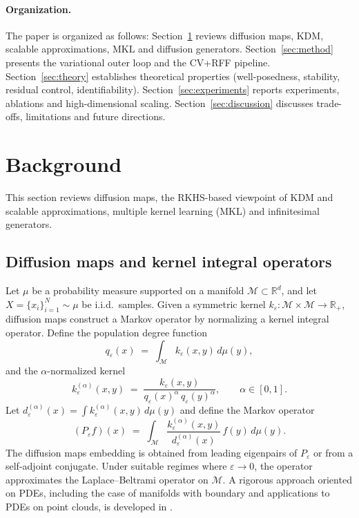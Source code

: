 \documentclass[11pt]{article}
\theoremstyle{remark}
\begin{document}
\paragraph{Organization.} The paper is organized as follows:
Section~\ref{sec:background} reviews diffusion maps, KDM, scalable approximations, MKL and diffusion generators.
Section~\ref{sec:method} presents the variational outer loop and the CV+RFF pipeline.
Section~\ref{sec:theory} establishes theoretical properties (well-posedness, stability, residual control, identifiability).
Section~\ref{sec:experiments} reports experiments, ablations and high-dimensional scaling.
Section~\ref{sec:discussion} discusses trade-offs, limitations and future directions.

\section{Background}
\label{sec:background}

This section reviews diffusion maps, the RKHS-based viewpoint of KDM and scalable approximations, multiple kernel learning (MKL) and infinitesimal generators.

\subsection{Diffusion maps and kernel integral operators}
\label{subsec:dm}

Let $\mu$ be a probability measure supported on a manifold $\mathcal{M}\subset\mathbb{R}^d$, and let $X=\{x_i\}_{i=1}^N\sim \mu$ be i.i.d.\ samples.
Given a symmetric kernel $k_\varepsilon:\mathcal{M}\times\mathcal{M}\to\mathbb{R}_+$, diffusion maps construct a Markov operator by normalizing a kernel integral operator.
Define the population degree function
\begin{equation}
q_\varepsilon(x) \;=\; \int_{\mathcal{M}} k_\varepsilon(x,y)\, d\mu(y),
\end{equation}
and the $\alpha$-normalized kernel
\begin{equation}
k_\varepsilon^{(\alpha)}(x,y)
\;=\;
\frac{k_\varepsilon(x,y)}{q_\varepsilon(x)^\alpha\, q_\varepsilon(y)^\alpha},
\qquad \alpha\in[0,1].
\label{eq:alpha-normalization}
\end{equation}
Let $d_\varepsilon^{(\alpha)}(x)=\int k_\varepsilon^{(\alpha)}(x,y)\,d\mu(y)$ and define the Markov operator
\begin{equation}
(P_\varepsilon f)(x)
\;=\;
\int_{\mathcal{M}}
\frac{k_\varepsilon^{(\alpha)}(x,y)}{d_\varepsilon^{(\alpha)}(x)}\,
f(y)\, d\mu(y).
\label{eq:markov-operator}
\end{equation}
The diffusion maps embedding is obtained from leading eigenpairs of $P_\varepsilon$ or from a self-adjoint conjugate.
Under suitable regimes where $\varepsilon\to0$, the operator approximates the Laplace--Beltrami operator on $\mathcal{M}$.
A rigorous approach oriented on PDEs, including the case of manifolds with boundary and applications to PDEs on point clouds, is developed in \citet{VAUGHN2024101593}.
\end{document}
